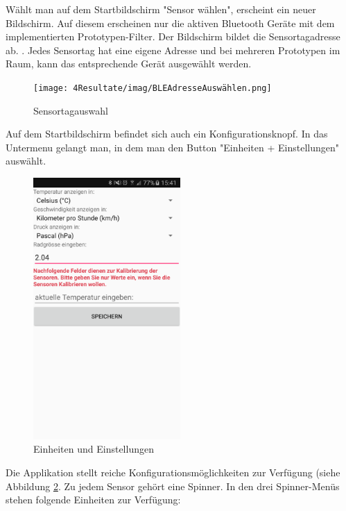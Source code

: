 Wählt man auf dem Startbildschirm "Sensor wählen",  erscheint ein neuer Bildschirm. Auf diesem erscheinen nur die aktiven Bluetooth Geräte mit dem implementierten Prototypen-Filter. Der Bildschirm bildet die Sensortagadresse ab. . Jedes Sensortag hat eine eigene Adresse und bei mehreren Prototypen im Raum, kann das entsprechende Gerät ausgewählt werden.


\begin{figure}[ht]
    \texttt{[image: 4Resultate/imag/BLEAdresseAuswählen.png]} 
    \caption{Sensortagauswahl}
    \label{sensorauswahl}
\end{figure}

Auf dem Startbildschirm befindet sich auch ein Konfigurationsknopf. In das Untermenu gelangt man, in dem man den Button "Einheiten + Einstellungen" auswählt.

\begin{figure}[ht]
    \includegraphics[width=0.5\textwidth]{4Resultate/imag/BLEEinheitenUndEinstellungenStart.png} 
    \caption{Einheiten und Einstellungen}
    \label{einheiten}
\end{figure}

Die Applikation stellt reiche Konfigurationsmöglichkeiten zur Verfügung (siehe Abbildung \ref{einheiten}. Zu jedem Sensor gehört eine Spinner. In den drei Spinner-Menüs stehen folgende Einheiten zur Verfügung:


